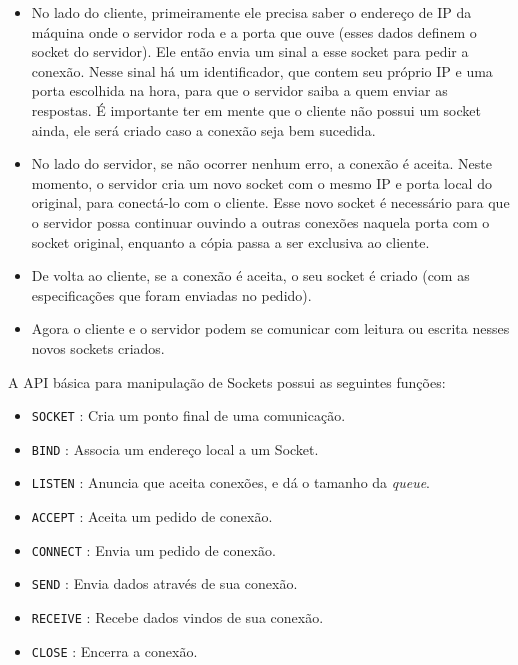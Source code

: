 \documentclass[a4paper,12pt]{article}
\newcommand{\code}[1]{\lstinline[mathescape=true, columns=fixed, basicstyle={\small\ttfamily}]{#1}}
\begin{document}
\begin{itemize}

    \item No lado do cliente, primeiramente ele precisa saber o endereço de IP da máquina onde o servidor roda e a porta que ouve (esses dados definem o socket do servidor). Ele então envia um sinal a esse socket para pedir a conexão. Nesse sinal há um identificador, que contem seu próprio IP e uma porta escolhida na hora, para que o servidor saiba a quem enviar as respostas. É importante ter em mente que o cliente não possui um socket ainda, ele será criado caso a conexão seja bem sucedida.

    \item No lado do servidor, se não ocorrer nenhum erro, a conexão é aceita. Neste momento, o servidor cria um novo socket com o mesmo IP e porta local do original, para conectá-lo com o cliente. Esse novo socket é necessário para que o servidor possa continuar ouvindo a outras conexões naquela porta com o socket original, enquanto a cópia passa a ser exclusiva ao cliente.

    \item De volta ao cliente, se a conexão é aceita, o seu socket é criado (com as especificações que foram enviadas no pedido).

    \item Agora o cliente e o servidor podem se comunicar com leitura ou escrita nesses novos sockets criados.
\end{itemize}

A API básica para manipulação de Sockets possui as seguintes funções:

\begin{itemize}

    \item \code{SOCKET} : Cria um ponto final de uma comunicação.
    \item \code{BIND} : Associa um endereço local a um Socket.
    \item \code{LISTEN} : Anuncia que aceita conexões, e dá o tamanho da \emph{queue}.
    \item \code{ACCEPT} : Aceita um pedido de conexão.
    \item \code{CONNECT} : Envia um pedido de conexão.
    \item \code{SEND} : Envia dados através de sua conexão.
    \item \code{RECEIVE} : Recebe dados vindos de sua conexão.
    \item \code{CLOSE} : Encerra a conexão.

\end{itemize}
\end{document}
